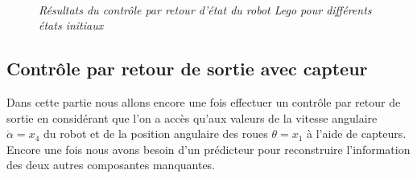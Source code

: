\documentclass[11pt,french]{article} %
\begin{document}
\begin{figure}[H]%
	\centering
	\noindent{} \\
		\captionsetup{justification=centering}
		\caption{\textit{Résultats du contrôle par retour d'état du robot Lego pour différents états initiaux}}
		\label{fig:robot_controle}%
\end{figure}
\vspace{0.5cm}


\subsection{Contrôle par retour de sortie avec capteur}

\quad Dans cette partie nous allons encore une fois effectuer un contrôle par retour de sortie en considérant que l'on a accès qu'aux valeurs de la vitesse angulaire $\dot\alpha = x_4$ du robot et de la position angulaire des roues $\theta = x_1$ à l'aide de capteurs. Encore une fois nous avons besoin d'un prédicteur pour reconstruire l'information des deux autres composantes manquantes. \\
\end{document}
